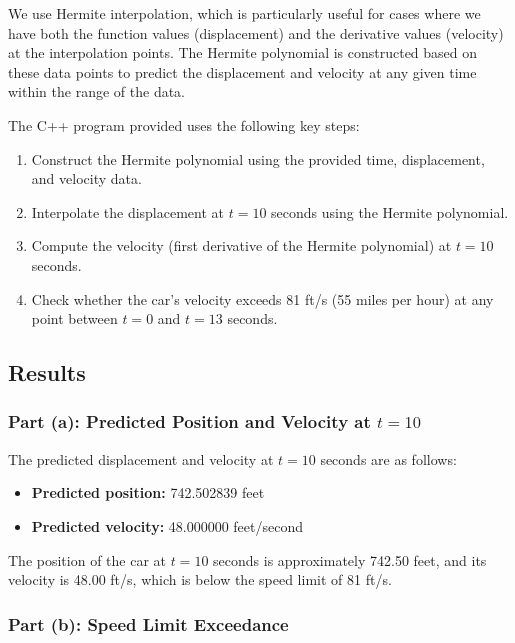 \documentclass{article}
\begin{document}
We use Hermite interpolation, which is particularly useful for cases where we have both the function values (displacement) and the derivative values (velocity) at the interpolation points. The Hermite polynomial is constructed based on these data points to predict the displacement and velocity at any given time within the range of the data.

The C++ program provided uses the following key steps:

\begin{enumerate}
    \item Construct the Hermite polynomial using the provided time, displacement, and velocity data.
    \item Interpolate the displacement at \( t = 10 \) seconds using the Hermite polynomial.
    \item Compute the velocity (first derivative of the Hermite polynomial) at \( t = 10 \) seconds.
    \item Check whether the car's velocity exceeds 81 ft/s (55 miles per hour) at any point between \( t = 0 \) and \( t = 13 \) seconds.
\end{enumerate}

\subsection{Results}

\subsubsection{Part (a): Predicted Position and Velocity at \( t = 10 \)}

The predicted displacement and velocity at \( t = 10 \) seconds are as follows:

\begin{itemize}
    \item \textbf{Predicted position:} 742.502839 feet
    \item \textbf{Predicted velocity:} 48.000000 feet/second
\end{itemize}

The position of the car at \( t = 10 \) seconds is approximately 742.50 feet, and its velocity is 48.00 ft/s, which is below the speed limit of 81 ft/s.

\subsubsection{Part (b): Speed Limit Exceedance}
\end{document}
